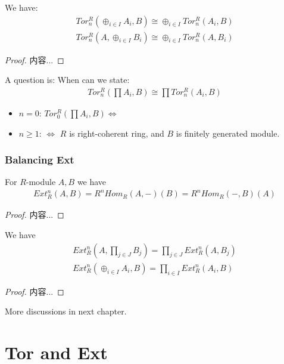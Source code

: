 \documentclass[Total.tex]{subfiles}
\begin{document}
			\begin{corollary}
				We have:
				\begin{gather*}
					Tor^R_n(\oplus_{i\in I} A_i,B)\cong \oplus_{i\in I}Tor_n^R(A_i,B)\\
					Tor^R_n(A,\oplus_{i\in I} B_i)\cong \oplus_{i\in I} Tor_n^R(A,B_i)
				\end{gather*}
			\end{corollary}
			\begin{proof}
				内容...
			\end{proof}
			
			A question is: When can we state:
			\begin{gather*}
				Tor^R_n(\prod A_i,B)\cong \prod Tor^R_n(A_i,B)
			\end{gather*}
			
			\begin{itemize}
				\item $n=0$: $Tor^R_0(\prod A_i,B) \Leftrightarrow$
				\item $n\geq 1$: $\Leftrightarrow$ $R$ is right-coherent ring, and $B$ is finitely generated module.
			\end{itemize}
			
			\subsection{Balancing Ext}
			\begin{theorem}
				For $R$-module $A,B$ we have
				\begin{gather*}
					Ext^n_R(A,B)=R^n Hom_R(A,-)(B)=R^nHom_R(-,B)(A)
				\end{gather*}
			\end{theorem}
			\begin{proof}
				内容...
			\end{proof}
			
			\begin{corollary}
				We have
				\begin{gather*}
					Ext^n_R(A,\prod_{j\in J} B_j)=\prod_{j\in J} Ext_R^n(A,B_j)\\
					Ext^n_R(\oplus_{i\in I} A_i,B)=\prod_{i\in I} Ext^n_R(A_i,B)
				\end{gather*}
			\end{corollary}
			\begin{proof}
				内容...
			\end{proof}
		More discussions in next chapter.
	\chapter{Tor and Ext}
\end{document}

